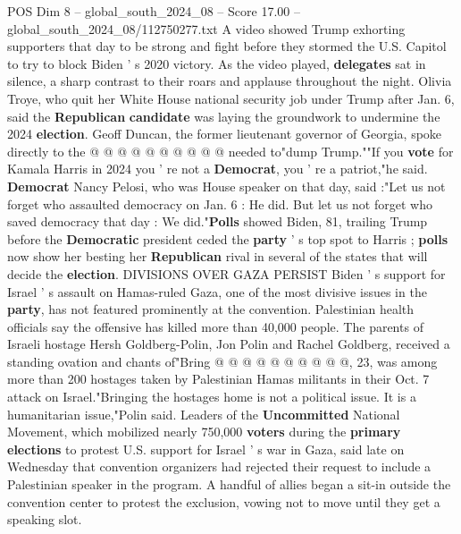 \begin{textsample}{POS Dim 8 – global\_south\_2024\_08 – Score 17.00 – global\_south\_2024\_08/112750277.txt}
A video showed Trump exhorting supporters that day to be strong and fight before they stormed the U.S.
Capitol to try to block Biden ' s 2020 victory.
As the video played, \textbf{delegates} sat in silence, a sharp contrast to their roars and applause throughout the night.
Olivia Troye, who quit her White House national security job under Trump after Jan. 6, said the \textbf{Republican} \textbf{candidate} was laying the groundwork to undermine the 2024 \textbf{election}.
Geoff Duncan, the former lieutenant governor of Georgia, spoke directly to the @ @ @ @ @ @ @ @ @ @ needed to"dump Trump.""If you \textbf{vote} for Kamala Harris in 2024 you ' re not a \textbf{Democrat}, you ' re a patriot,"he said. \textbf{Democrat} Nancy Pelosi, who was House speaker on that day, said :"Let us not forget who assaulted democracy on Jan. 6 : He did.
But let us not forget who saved democracy that day : We did."\textbf{Polls} showed Biden, 81, trailing Trump before the \textbf{Democratic} president ceded the \textbf{party} ' s top spot to Harris ; \textbf{polls} now show her besting her \textbf{Republican} rival in several of the states that will decide the \textbf{election}.
DIVISIONS OVER GAZA PERSIST Biden ' s support for Israel ' s assault on Hamas-ruled Gaza, one of the most divisive issues in the \textbf{party}, has not featured prominently at the convention.
Palestinian health officials say the offensive has killed more than 40,000 people.
The parents of Israeli hostage Hersh Goldberg-Polin, Jon Polin and Rachel Goldberg, received a standing ovation and chants of"Bring @ @ @ @ @ @ @ @ @ @, 23, was among more than 200 hostages taken by Palestinian Hamas militants in their Oct. 7 attack on Israel."Bringing the hostages home is not a political issue.
It is a humanitarian issue,"Polin said.
Leaders of the \textbf{Uncommitted} National Movement, which mobilized nearly 750,000 \textbf{voters} during the \textbf{primary} \textbf{elections} to protest U.S. support for Israel ' s war in Gaza, said late on Wednesday that convention organizers had rejected their request to include a Palestinian speaker in the program.
A handful of allies began a sit-in outside the convention center to protest the exclusion, vowing not to move until they get a speaking slot.

\end{textsample}
